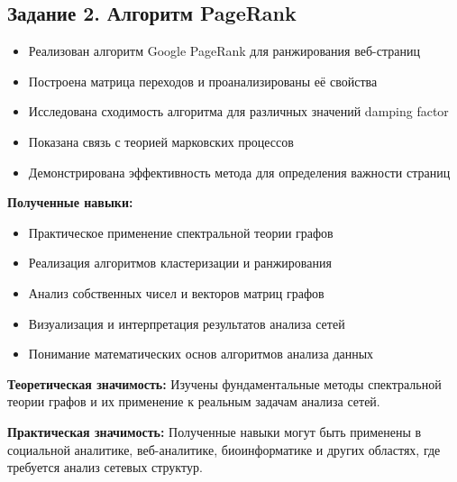 \subsection*{Задание 2. Алгоритм PageRank}

\begin{itemize}
    \item Реализован алгоритм Google PageRank для ранжирования веб-страниц
    \item Построена матрица переходов и проанализированы её свойства
    \item Исследована сходимость алгоритма для различных значений damping factor
    \item Показана связь с теорией марковских процессов
    \item Демонстрирована эффективность метода для определения важности страниц
\end{itemize}

\textbf{Полученные навыки:}
\begin{itemize}
    \item Практическое применение спектральной теории графов
    \item Реализация алгоритмов кластеризации и ранжирования
    \item Анализ собственных чисел и векторов матриц графов
    \item Визуализация и интерпретация результатов анализа сетей
    \item Понимание математических основ алгоритмов анализа данных
\end{itemize}

\textbf{Теоретическая значимость:} Изучены фундаментальные методы спектральной теории графов и их применение к реальным задачам анализа сетей.

\textbf{Практическая значимость:} Полученные навыки могут быть применены в социальной аналитике, веб-аналитике, биоинформатике и других областях, где требуется анализ сетевых структур.
